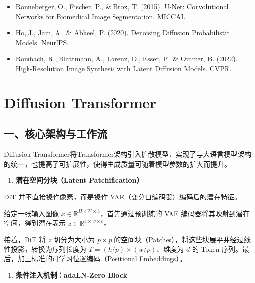 \begin{itemize}
\tightlist
\item
  Ronneberger, O., Fischer, P., \& Brox, T. (2015). \href{https://arxiv.org/abs/1505.04597}{U-Net: Convolutional Networks for Biomedical Image Segmentation}. MICCAI.
\item
  Ho, J., Jain, A., \& Abbeel, P. (2020). \href{https://arxiv.org/abs/2006.11239}{Denoising Diffusion Probabilistic Models}. NeurIPS.
\item
  Rombach, R., Blattmann, A., Lorenz, D., Esser, P., \& Ommer, B. (2022). \href{https://arxiv.org/abs/2112.10752}{High-Resolution Image Synthesis with Latent Diffusion Models}. CVPR.
\end{itemize}

\clearpage

\hypertarget{diffusion-transformer}{%
\section{Diffusion Transformer}\label{diffusion-transformer}}

\hypertarget{ux4e00ux6838ux5fc3ux67b6ux6784ux4e0eux5de5ux4f5cux6d41}{%
\subsection{一、核心架构与工作流}\label{ux4e00ux6838ux5fc3ux67b6ux6784ux4e0eux5de5ux4f5cux6d41}}

Diffusion Transformer将Transformer架构引入扩散模型，实现了与大语言模型架构的统一，也提高了可扩展性，使得生成质量可随着模型参数的扩大而提升。

\begin{enumerate}
\def\labelenumi{\arabic{enumi}.}
\tightlist
\item
  \textbf{潜在空间分块（Latent Patchification）}
\end{enumerate}

DiT 并不直接操作像素，而是操作 VAE（变分自编码器）编码后的潜在特征。

给定一张输入图像 \(x\in\mathbb{R}^{H\times W\times 3}\)，首先通过预训练的 VAE 编码器将其映射到潜在空间，得到潜在表示 \(z\in\mathbb{R}^{h\times w\times c}\)。

接着，DiT 将 \(z\) 切分为大小为 \(p\times p\) 的空间块（Patches），将这些块展平并经过线性投影，转换为序列长度为 \(T=(h/p)\times(w/p)\)、维度为 \(d\) 的 Token 序列。最后，加上标准的可学习位置编码（Positional Embeddings）。

\begin{enumerate}
\def\labelenumi{\arabic{enumi}.}
\setcounter{enumi}{1}
\tightlist
\item
  \textbf{条件注入机制：adaLN-Zero Block}
\end{enumerate}

